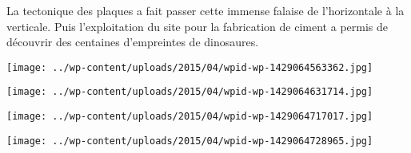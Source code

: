  \newline
 La tectonique des plaques a fait passer cette immense falaise de l'horizontale à la verticale. Puis l'exploitation du site pour la fabrication de ciment a permis de découvrir des centaines d'empreintes de dinosaures.  \newline
 \newline
\centerline{\texttt{[image: ../wp-content/uploads/2015/04/wpid-wp-1429064563362.jpg]} } 
 \newline
 \newline
\centerline{\texttt{[image: ../wp-content/uploads/2015/04/wpid-wp-1429064631714.jpg]} } 
 \newline
 \newline
\centerline{\texttt{[image: ../wp-content/uploads/2015/04/wpid-wp-1429064717017.jpg]} } 
 \newline
 \newline
\centerline{\texttt{[image: ../wp-content/uploads/2015/04/wpid-wp-1429064728965.jpg]} } 
 \newline

\newpage
 
